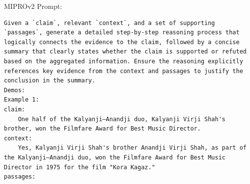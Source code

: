 \begin{instructbox}
MIPROv2 Prompt:
\begin{lstlisting}[breakindent=0pt, breaklines=true, breakatwhitespace=true, frame=single, backgroundcolor=\color{green!10}]
Given a `claim`, relevant `context`, and a set of supporting `passages`, generate a detailed step-by-step reasoning process that logically connects the evidence to the claim, followed by a concise summary that clearly states whether the claim is supported or refuted based on the aggregated information. Ensure the reasoning explicitly references key evidence from the context and passages to justify the conclusion in the summary.
Demos:
Example 1:
claim:
    One half of the Kalyanji–Anandji duo, Kalyanji Virji Shah's brother, won the Filmfare Award for Best Music Director.
context:
    Yes, Kalyanji Virji Shah's brother Anandji Virji Shah, as part of the Kalyanji–Anandji duo, won the Filmfare Award for Best Music Director in 1975 for the film "Kora Kagaz."
passages:

\end{lstlisting}
\end{instructbox}
